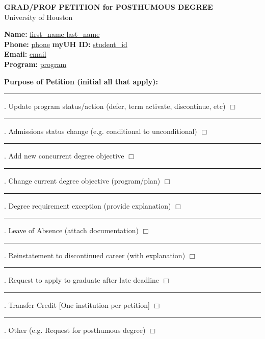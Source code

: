 \documentclass[9pt]{article}
\begin{document}
\begin{center}
    {\Large \textbf{GRAD/PROF PETITION for POSTHUMOUS DEGREE}} \\
    \vspace{0.5em}
    University of Houston
\end{center}

\vspace{1em}

\noindent \textbf{Name:} \underline{{{first_name}} {{last_name}}} \\
\textbf{Phone:} \underline{{{phone}}} \hfill \textbf{myUH ID:} \underline{{{student_id}}} \\
\textbf{Email:} \underline{{{email}}} \\
\textbf{Program:} \underline{{{program}}}

\vspace{1em}

\noindent \textbf{Purpose of Petition (initial all that apply):}

\vspace{0.5em}
\noindent \rule{1in}{0.4pt} . Update program status/action (defer, term activate, discontinue, etc) \quad $\Box$ \\[0.5em]
\noindent \rule{1in}{0.4pt} . Admissions status change (e.g. conditional to unconditional) \quad $\Box$ \\[0.5em]
\noindent \rule{1in}{0.4pt} . Add new concurrent degree objective \quad $\Box$ \\[0.5em]
\noindent \rule{1in}{0.4pt} . Change current degree objective (program/plan) \quad $\Box$ \\[0.5em]
\noindent \rule{1in}{0.4pt} . Degree requirement exception (provide explanation) \quad $\Box$ \\[0.5em]
\noindent \rule{1in}{0.4pt} . Leave of Absence (attach documentation) \quad $\Box$ \\[0.5em]
\noindent \rule{1in}{0.4pt} . Reinstatement to discontinued career (with explanation) \quad $\Box$ \\[0.5em]
\noindent \rule{1in}{0.4pt} . Request to apply to graduate after late deadline \quad $\Box$ \\[0.5em]
\noindent \rule{1in}{0.4pt} . Transfer Credit [One institution per petition] \quad $\Box$ \\[0.5em]
\noindent \rule{1in}{0.4pt} . Other (e.g. Request for posthumous degree) \quad $\Box$

\vspace{1em}
\end{document}
